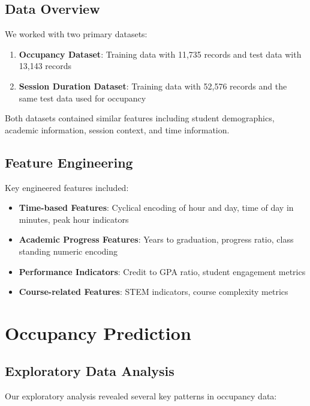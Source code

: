 \documentclass[12pt,letterpaper]{article}
\begin{document}
\subsection{Data Overview}

We worked with two primary datasets:

\begin{enumerate}
    \item \textbf{Occupancy Dataset}: 
    Training data with 11,735 records and test data with 13,143 records
    
    \item \textbf{Session Duration Dataset}:
    Training data with 52,576 records and the same test data used for occupancy
\end{enumerate}

Both datasets contained similar features including student demographics, academic information, session context, and time information.

\subsection{Feature Engineering}

Key engineered features included:

\begin{itemize}
    \item \textbf{Time-based Features}: Cyclical encoding of hour and day, time of day in minutes, peak hour indicators
    \item \textbf{Academic Progress Features}: Years to graduation, progress ratio, class standing numeric encoding
    \item \textbf{Performance Indicators}: Credit to GPA ratio, student engagement metrics
    \item \textbf{Course-related Features}: STEM indicators, course complexity metrics
\end{itemize}

\section{Occupancy Prediction}

\subsection{Exploratory Data Analysis}

Our exploratory analysis revealed several key patterns in occupancy data:
\end{document}
